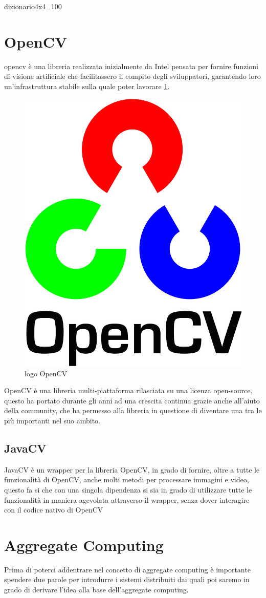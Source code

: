 \documentclass[12pt,a4paper,openright,twoside]{book}
\begin{document}
\begin{center}
	\gls{dizionario4x4_100}
\end{center}

\section{OpenCV} \label{sec:opencv}
\acrfull{opencv} è una libreria realizzata inizialmente da Intel pensata per fornire funzioni di visione artificiale che facilitassero il compito degli sviluppatori, garantendo loro un'infrastruttura stabile sulla quale poter lavorare \ref{fig:opencvLogo}.
\begin{figure}[h!]
	\centering
	\includegraphics[width=0.3\linewidth]{figures/opencvLogo.png}
	\caption{logo OpenCV}
	\label{fig:opencvLogo}
\end{figure}


OpenCV è una libreria multi-piattaforma rilasciata su una licenza open-source, questo ha portato durante gli anni ad una crescita continua grazie anche all'aiuto della community, che ha permesso alla libreria in questione di diventare una tra le più importanti nel suo ambito. \cite{baggio2015opencv} \cite{OpenCVMainPage}

\subsection{JavaCV} \label{subsec:javacv}
JavaCV è un wrapper per la libreria OpenCV, in grado di fornire, oltre a tutte le funzionalità di OpenCV, anche molti metodi per processare immagini e video, questo fa si che con una singola dipendenza si sia in grado di utilizzare tutte le funzionalità in maniera agevolata attraverso il wrapper, senza dover interagire con il codice nativo di OpenCV \cite{javaCVRepo}

\section{Aggregate Computing}
Prima di poterci addentrare nel concetto di aggregate computing è importante spendere due parole per introdurre i sistemi distribuiti dai quali poi saremo in grado di derivare l'idea alla base dell'aggregate computing.
\end{document}
